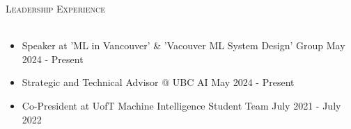 \documentclass[a4paper]{article}
\newcommand{\lineunder} {
    \vspace*{-8pt} \\
    \hspace*{-18pt} \hrulefill \\
}
\newcommand{\header} [1] {
    {\hspace*{-18pt}\vspace*{6pt} \textsc{#1}}
    \vspace*{-6pt} \lineunder
}
\begin{document}
\vspace{1mm}
\header{Leadership Experience}
\vspace{-3mm}
\begin{itemize} \itemsep 0.5pt
    \item \begin{normalsize} Speaker at 'ML in Vancouver' \& 'Vacouver ML System Design' Group \hfill May 2024 - Present \end{normalsize}
	\vspace{-2mm}
    \item \begin{normalsize} Strategic and Technical Advisor @ UBC AI \hfill May 2024 - Present \end{normalsize}
	\vspace{-2mm}
    \item \begin{normalsize} Co-President at UofT Machine Intelligence Student Team \hfill July 2021 - July 2022 \end{normalsize}
	\vspace{-2mm}
\end{itemize}
\end{document}
